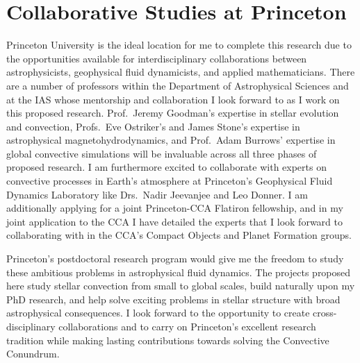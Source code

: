 \documentclass[onecolumn, hmargin=1in, vmargin=1in]{aastex62}
\begin{document}
\vspace{-6pt}
\section*{\textbf{Collaborative Studies at Princeton}}
Princeton University is the ideal location for me to complete this research due to the opportunities available for interdisciplinary collaborations between astrophysicists, geophysical fluid dynamicists, and applied mathematicians.
There are a number of professors within the Department of Astrophysical Sciences and at the IAS whose mentorship and collaboration I look forward to as I work on this proposed research.
Prof.~Jeremy Goodman's expertise in stellar evolution and convection, Profs.~Eve Ostriker's and James Stone's expertise in astrophysical magnetohydrodynamics, and Prof.~Adam Burrows' expertise in global convective simulations will be invaluable across all three phases of proposed research.
I am furthermore excited to collaborate with experts on convective processes in Earth's atmosphere at Princeton's Geophysical Fluid Dynamics Laboratory like Drs.~Nadir Jeevanjee and Leo Donner.
I am additionally applying for a joint Princeton-CCA Flatiron fellowship, and in my joint application to the CCA I have detailed the experts that I look forward to collaborating with in the CCA's Compact Objects and Planet Formation groups.

Princeton's postdoctoral research program would give me the freedom to study these ambitious problems in astrophysical fluid dynamics.
The projects proposed here study stellar convection from small to global scales, build naturally upon my PhD research, and help solve exciting problems in stellar structure with broad astrophysical consequences.
I look forward to the opportunity to create cross-disciplinary collaborations and to carry on Princeton's excellent research tradition while making lasting contributions towards solving the Convective Conundrum.

\vspace{-11pt}


\end{document}
